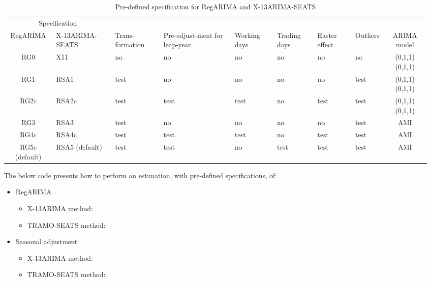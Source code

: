 \documentclass[article]{jss}
\providecommand{\tightlist}{%
  \setlength{\itemsep}{0pt}\setlength{\parskip}{0pt}}
\begin{document}
\begin{table}[t]

\caption{\label{tab:pre_def_x13}Pre-defined specification for RegARIMA and X-13ARIMA-SEATS}
\centering
\fontsize{7}{9}\selectfont
\begin{tabular}{c>{\centering\arraybackslash}p{1.7cm}>{\centering\arraybackslash}p{}>{\centering\arraybackslash}p{1.4cm}>{\centering\arraybackslash}p{0.9cm}>{\centering\arraybackslash}p{0.9cm}>{\centering\arraybackslash}p{0.9cm}>{\centering\arraybackslash}p{0.9cm}c}
\toprule
\multicolumn{2}{c}{Specification} & \multicolumn{1}{c}{} \\
\cmidrule(l{3pt}r{3pt}){1-2}
RegARIMA & X-13ARIMA-SEATS & Trans-formation & Pre-adjust-ment for leap-year & Working days & Trading days & Easter effect & Outliers & ARIMA model\\
\midrule
RG0 & X11 & no & no & no & no & no & no & (0,1,1)(0,1,1)\\
RG1 & RSA1 & test & no & no & no & no & test & (0,1,1)(0,1,1)\\
RG2c & RSA2c & test & test & test & no & test & test & (0,1,1)(0,1,1)\\
RG3 & RSA3 & test & no & no & no & no & test & AMI\\
RG4c & RSA4c & test & test & test & no & test & test & AMI\\
\addlinespace
RG5c (default) & RSA5 (default) & test & test & no & test & test & test & AMI\\
\bottomrule
\end{tabular}
\end{table}

The below code presents how to perform an estimation, with pre-defined
specifications, of:

\begin{itemize}
\tightlist
\item
  RegARIMA

  \begin{itemize}
  \tightlist
  \item
    X-13ARIMA method:
  \item
    TRAMO-SEATS method:
  \end{itemize}
\item
  Seasonal adjustment

  \begin{itemize}
  \tightlist
  \item
    X-13ARIMA method:
  \item
    TRAMO-SEATS method:
  \end{itemize}
\end{itemize}
\end{document}
